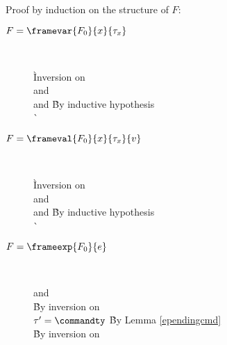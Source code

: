 \begin{enumerate}
  Proof by induction on the structure of $F$:
  \begin{description}
  \item[$F = \framevar{F_0}{x}{\tau_{x}}$] \ \\
    \vspace{-1.8em}
    \begin{tabbing}
      \` Inversion on  \\
     and  \\
    and 
      \` By inductive hypothesis \\
      \`  \\
    \end{tabbing}
  \item[$F = \frameval{F_0}{x}{\tau_x}{v}$] \ \\
    \vspace{-1.8em}
    \begin{tabbing}
      \` Inversion on  \\
     and  \\
    and 
      \` By inductive hypothesis \\
      \`  \\
    \end{tabbing}
  \item[$F = \frameexp{F_0}{e}$] \ \\
    \vspace{-1.8em}
    \begin{tabbing}
     and  \\
      \` By inversion on  \\
    $\tau' = \commandty$
      \` By Lemma \ref{ependingcmd} \\
      \` By inversion on  \\

\end{tabbing}
\end{description}
\end{enumerate}

